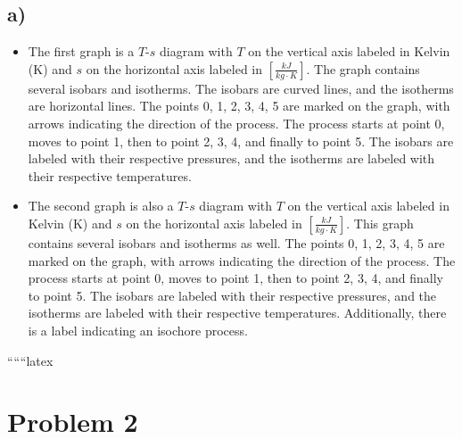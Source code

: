 

\subsection*{a)}

\begin{itemize}
    \item The first graph is a $T$-$s$ diagram with $T$ on the vertical axis labeled in Kelvin (K) and $s$ on the horizontal axis labeled in $\left[\frac{kJ}{kg \cdot K}\right]$. The graph contains several isobars and isotherms. The isobars are curved lines, and the isotherms are horizontal lines. The points 0, 1, 2, 3, 4, 5 are marked on the graph, with arrows indicating the direction of the process. The process starts at point 0, moves to point 1, then to point 2, 3, 4, and finally to point 5. The isobars are labeled with their respective pressures, and the isotherms are labeled with their respective temperatures.
    
    \item The second graph is also a $T$-$s$ diagram with $T$ on the vertical axis labeled in Kelvin (K) and $s$ on the horizontal axis labeled in $\left[\frac{kJ}{kg \cdot K}\right]$. This graph contains several isobars and isotherms as well. The points 0, 1, 2, 3, 4, 5 are marked on the graph, with arrows indicating the direction of the process. The process starts at point 0, moves to point 1, then to point 2, 3, 4, and finally to point 5. The isobars are labeled with their respective pressures, and the isotherms are labeled with their respective temperatures. Additionally, there is a label indicating an isochore process.
\end{itemize}

``````latex

\section*{Problem 2}